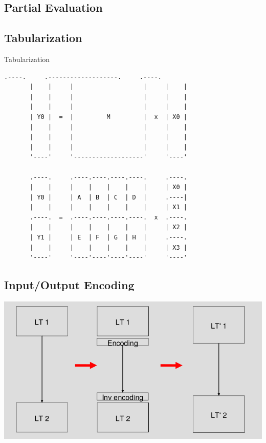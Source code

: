 \documentclass{beamer}
\begin{document}
\subsection{Partial Evaluation}

\subsection{Tabularization}{Tabularization}

\begin{frame}[fragile] 

\begin{Verbatim}[samepage=true]
       .----.     .-------------------.     .----.
       |    |     |                   |     |    |
       |    |     |                   |     |    |
       |    |     |                   |     |    |
       | Y0 |  =  |         M         |  x  | X0 |
       |    |     |                   |     |    |
       |    |     |                   |     |    |
       |    |     |                   |     |    |
       '----'     '-------------------'     '----'

       .----.     .----.----.----.----.     .----.
       |    |     |    |    |    |    |     | X0 |
       | Y0 |     | A  | B  | C  | D  |     .----|
       |    |     |    |    |    |    |     | X1 |
       .----.  =  .----.----.----.----.  x  .----.
       |    |     |    |    |    |    |     | X2 |
       | Y1 |     | E  | F  | G  | H  |     .----.
       |    |     |    |    |    |    |     | X3 |
       '----'     '----'----'----'----'     '----'
\end{Verbatim}

\end{frame}

\subsection{Input/Output Encoding}

\begin{frame}
\includegraphics[scale=0.50]{images/encoding.png}
\end{frame}
\end{document}
